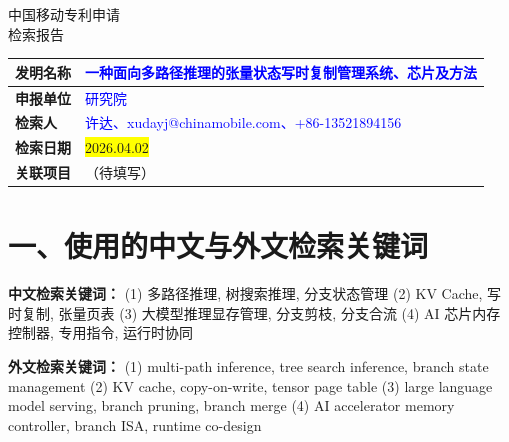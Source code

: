 \documentclass[12pt,a4paper]{article}
\begin{document}
\noindent

\vspace{1em}

\begin{center}
    {\Huge\heiti 中国移动专利申请} \\[0.5em]
    {\Huge\heiti 检索报告} \\[1em]
\end{center}

\begin{table}[h]
    \centering
    \renewcommand{\arraystretch}{2}
    \begin{tabular}{|p{3cm}|p{12cm}|}
        \hline
        \textbf{发明名称} & \textcolor{blue}{一种面向多路径推理的张量状态写时复制管理系统、芯片及方法} \\
        \hline
        \textbf{申报单位} & \textcolor{blue}{研究院} \\
        \hline
        \textbf{检索人} & \textcolor{blue}{许达、xudayj@chinamobile.com、+86-13521894156} \\
        \hline
        \textbf{检索日期} & \colorbox{yellow}{2026.04.02} \\
        \hline
        \textbf{关联项目} & （待填写） \\
        \hline
    \end{tabular}
\end{table}

\vspace{0.5em}

\noindent{}

\vspace{1em}

\section*{一、使用的中文与外文检索关键词}

\textbf{中文检索关键词：}
(1) 多路径推理, 树搜索推理, 分支状态管理
(2) KV Cache, 写时复制, 张量页表
(3) 大模型推理显存管理, 分支剪枝, 分支合流
(4) AI 芯片内存控制器, 专用指令, 运行时协同

\textbf{外文检索关键词：}
(1) multi-path inference, tree search inference, branch state management
(2) KV cache, copy-on-write, tensor page table
(3) large language model serving, branch pruning, branch merge
(4) AI accelerator memory controller, branch ISA, runtime co-design
\end{document}
